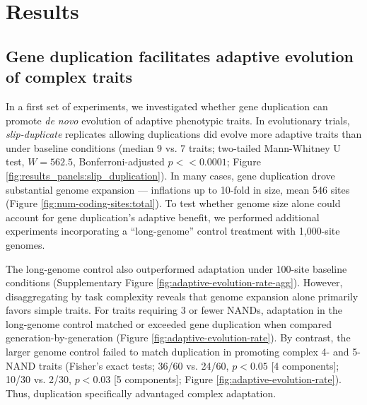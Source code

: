 \section{Results} \label{sec:results}

\subsection{Gene duplication facilitates adaptive evolution of complex traits}



In a first set of experiments, we investigated whether gene duplication can promote \textit{de novo} evolution of adaptive phenotypic traits.
In evolutionary trials, \textit{slip-duplicate} replicates allowing duplications did evolve more adaptive traits than under baseline conditions (median 9 vs. 7 traits; two-tailed Mann-Whitney U test, $W = 562.5$, Bonferroni-adjusted $p << 0.0001$; Figure \ref{fig:results_panels:slip_duplication}).
In many cases, gene duplication drove substantial genome expansion --- inflations up to 10-fold in size, mean 546 sites (Figure \ref{fig:num-coding-sites:total}).
To test whether genome size alone could account for gene duplication's adaptive benefit, we performed additional experiments incorporating a ``long-genome'' control treatment with 1,000-site genomes.



The long-genome control also outperformed adaptation under 100-site baseline conditions (Supplementary Figure \ref{fig:adaptive-evolution-rate-agg}).
However, disaggregating by task complexity reveals that genome expansion alone primarily favors simple traits.
For traits requiring 3 or fewer NANDs, adaptation in the long-genome control matched or exceeded gene duplication when compared generation-by-generation (Figure \ref{fig:adaptive-evolution-rate}).
By contrast, the larger genome control failed to match duplication in promoting complex 4- and 5-NAND traits (Fisher's exact tests; 36/60 vs. 24/60, $p<0.05$ [4 components]; 10/30 vs. 2/30, $p<0.03$ [5 components]; Figure \ref{fig:adaptive-evolution-rate}).
Thus, duplication specifically advantaged complex adaptation.

